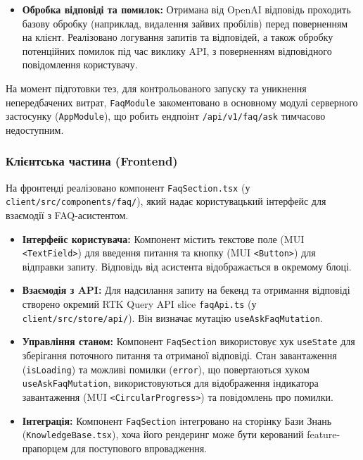 \begin{itemize}
    \item \textbf{Обробка відповіді та помилок:} Отримана від OpenAI відповідь проходить базову обробку (наприклад, видалення зайвих пробілів) перед поверненням на клієнт. Реалізовано логування запитів та відповідей, а також обробку потенційних помилок під час виклику API, з поверненням відповідного повідомлення користувачу.

\end{itemize}
На момент підготовки тез, для контрольованого запуску та уникнення непередбачених витрат, \texttt{FaqModule} закоментовано в основному модулі серверного застосунку (\texttt{AppModule}), що робить ендпоінт \texttt{/api/v1/faq/ask} тимчасово недоступним.

\subsubsection{Клієнтська частина (Frontend)}
На фронтенді реалізовано компонент \texttt{FaqSection.tsx} (у \texttt{client/src/components/faq/}), який надає користувацький інтерфейс для взаємодії з FAQ-асистентом. 
\begin{itemize}
    \item \textbf{Інтерфейс користувача:} Компонент містить текстове поле (MUI \texttt{<TextField>}) для введення питання та кнопку (MUI \texttt{<Button>}) для відправки запиту. Відповідь від асистента відображається в окремому блоці.
    \item \textbf{Взаємодія з API:} Для надсилання запиту на бекенд та отримання відповіді створено окремий RTK Query API slice \texttt{faqApi.ts} (у \texttt{client/src/store/api/}). Він визначає мутацію \texttt{useAskFaqMutation}.
    \item \textbf{Управління станом:} Компонент \texttt{FaqSection} використовує хук \texttt{useState} для зберігання поточного питання та отриманої відповіді. Стан завантаження (\texttt{isLoading}) та можливі помилки (\texttt{error}), що повертаються хуком \texttt{useAskFaqMutation}, використовуються для відображення індикатора завантаження (MUI \texttt{<CircularProgress>}) та повідомлень про помилки.
    \item \textbf{Інтеграція:} Компонент \texttt{FaqSection} інтегровано на сторінку Бази Знань (\texttt{KnowledgeBase.tsx}), хоча його рендеринг може бути керований feature-прапорцем для поступового впровадження.
\end{itemize}

